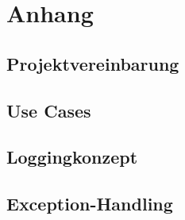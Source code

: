 \chapter{Anhang}

\section{Projektvereinbarung}
\label{projektvereinbarung}

\section{Use Cases}
\label{usecases}

\section{Loggingkonzept}
\label{loggingkonzept}

\section{Exception-Handling}
\label{exceptionhandling}


